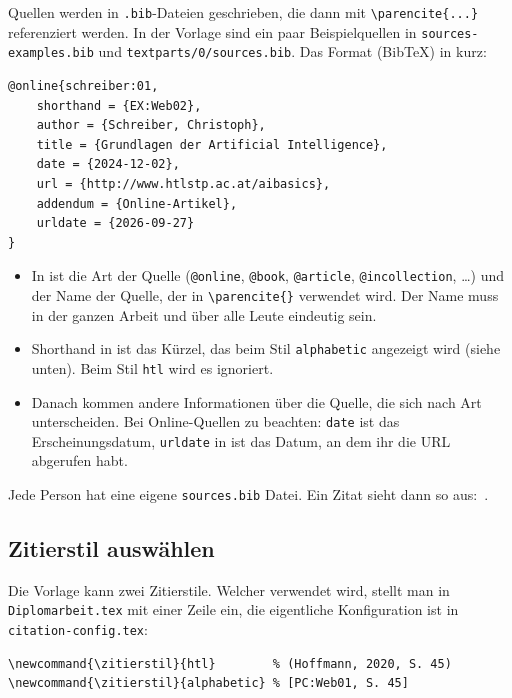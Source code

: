 Quellen werden in \verb|.bib|-Dateien geschrieben, die dann mit \verb|\parencite{...}| referenziert werden. In der Vorlage sind ein paar Beispielquellen in \verb|sources-examples.bib| und \verb|textparts/0/sources.bib|. Das Format (BibTeX) in kurz:

\begin{lstlisting}[caption={Beispiel für eine Quelle in BibTeX}, label={lst:bibtex-example}]
@online{schreiber:01,
    shorthand = {EX:Web02},
    author = {Schreiber, Christoph},
    title = {Grundlagen der Artificial Intelligence},
    date = {2024-12-02},
    url = {http://www.htlstp.ac.at/aibasics},
    addendum = {Online-Artikel},
    urldate = {2026-09-27}
}
\end{lstlisting}

\begin{itemize}
    \item In  ist die Art der Quelle (\verb|@online|, \verb|@book|, \verb|@article|, \verb|@incollection|, \dots) und der Name der Quelle, der in \verb|\parencite{}| verwendet wird. Der Name muss in der ganzen Arbeit und über alle Leute eindeutig sein.
    \item Shorthand in  ist das Kürzel, das beim Stil \texttt{alphabetic} angezeigt wird (siehe unten). Beim Stil \texttt{htl} wird es ignoriert.
    \item Danach kommen andere Informationen über die Quelle, die sich nach Art unterscheiden. Bei Online-Quellen zu beachten: \verb|date| ist das Erscheinungsdatum, \verb|urldate| in  ist das Datum, an dem ihr die URL abgerufen habt.
\end{itemize}

Jede Person hat eine eigene \verb|sources.bib| Datei. Ein Zitat sieht dann so aus:~\parencite{schreiber:01}.

\subsection{Zitierstil auswählen}

Die Vorlage kann zwei Zitierstile. Welcher verwendet wird, stellt man in \verb|Diplomarbeit.tex| mit einer Zeile ein, die eigentliche Konfiguration ist in \verb|citation-config.tex|:

\begin{lstlisting}[caption={Zitierstil in Diplomarbeit.tex auswählen}, label={lst:zitierstil}]
\newcommand{\zitierstil}{htl}        % (Hoffmann, 2020, S. 45)
\newcommand{\zitierstil}{alphabetic} % [PC:Web01, S. 45]
\end{lstlisting}

